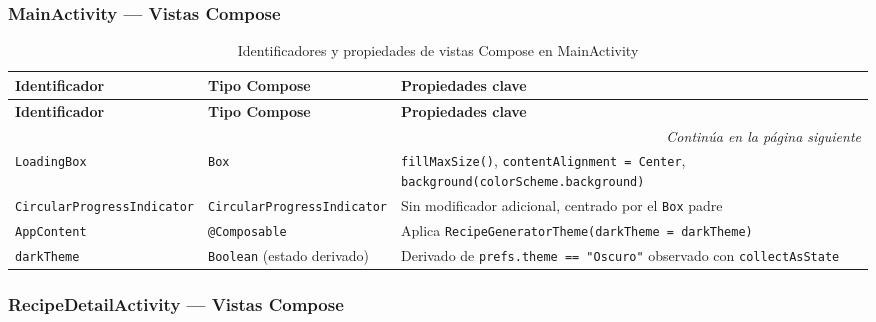 \documentclass[stu, 12pt, letterpaper, donotrepeattitle, floatsintext, natbib]{apa7}
\begin{document}
\subsubsection{MainActivity --- Vistas Compose}

\begin{longtable}{@{}p{2.5cm}p{4.5cm}p{8.5cm}@{}}
\caption{Identificadores y propiedades de vistas Compose en MainActivity}
\label{tab:idmainactivity}\\
\toprule
\textbf{Identificador} & \textbf{Tipo Compose} & \textbf{Propiedades clave} \\
\midrule
\endfirsthead
\toprule
\textbf{Identificador} & \textbf{Tipo Compose} & \textbf{Propiedades clave} \\
\midrule
\endhead
\midrule
\multicolumn{3}{r}{\small\textit{Continúa en la página siguiente}}\\
\endfoot
\bottomrule
\endlastfoot
\texttt{LoadingBox} & \texttt{Box} & \texttt{fillMaxSize()}, \texttt{contentAlignment = Center}, \texttt{background(colorScheme.background)} \\[3pt]
\texttt{CircularProgressIndicator} & \texttt{CircularProgressIndicator} & Sin modificador adicional, centrado por el \texttt{Box} padre \\[3pt]
\texttt{AppContent} & \texttt{@Composable} & Aplica \texttt{RecipeGeneratorTheme(darkTheme = darkTheme)} \\[3pt]
\texttt{darkTheme} & \texttt{Boolean} (estado derivado) & Derivado de \texttt{prefs.theme == "Oscuro"} observado con \texttt{collectAsState} \\
\end{longtable}

\subsubsection{RecipeDetailActivity --- Vistas Compose}
\end{document}
